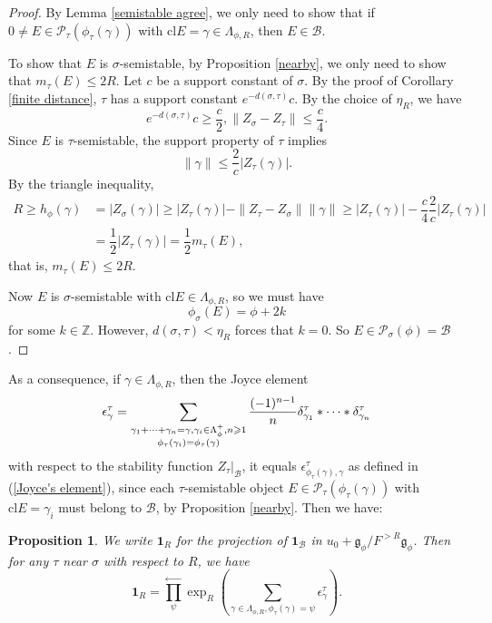 \documentclass[a4paper,12pt]{amsart}
\numberwithin{equation}{section}
\newtheorem{proposition}[theorem]{Proposition}
\newcommand{\cl}{\mathrm{cl}}
\newcommand{\1}{\mathbf{1}}
\begin{document}
\begin{proof}
    By Lemma \ref{semistable agree}, we only need to show that if $0\neq E\in\mathcal{P}_\tau(\phi_\tau(\gamma))$ with $\cl E=\gamma\in\Lambda_{\phi,R}$, then $E\in\mathcal{B}$.

    To show that $E$ is $\sigma$-semistable, by Proposition \ref{nearby}, we only need to show that $m_\tau(E)\leqslant2R$. Let $c$ be a support constant of $\sigma$. By the proof of Corollary \ref{finite distance}, $\tau$ has a support constant $e^{-d(\sigma,\tau)}c$. By the choice of $\eta_R$, we have
    \[e^{-d(\sigma,\tau)}c\geqslant\dfrac{c}{2},\|Z_\sigma-Z_\tau\|\leqslant\dfrac{c}{4}.\]
    Since $E$ is $\tau$-semistable, the support property of $\tau$ implies
    \[\|\gamma\|\leqslant\dfrac{2}{c}|Z_\tau(\gamma)|.\]
    By the triangle inequality,
    \begin{align*}
        R\geqslant h_\phi(\gamma)&=|Z_\sigma(\gamma)|\geqslant|Z_\tau(\gamma)|-\|Z_\tau-Z_\sigma\|\|\gamma\|\geqslant|Z_\tau(\gamma)|-\dfrac{c}{4}\dfrac{2}{c}|Z_\tau(\gamma)|\\
        &=\dfrac12|Z_\tau(\gamma)|=\dfrac12m_\tau(E),
    \end{align*}
    that is, $m_\tau(E)\leqslant2R$.

    Now $E$ is $\sigma$-semistable with $\cl E\in\Lambda_{\phi,R}$, so we must have
    \[\phi_\sigma(E)=\phi+2k\]
    for some $k\in\mathbb{Z}$. However, $d(\sigma,\tau)<\eta_R$ forces that $k=0$. So $E\in\mathcal{P}_\sigma(\phi)=\mathcal{B}$.
\end{proof}
As a consequence, if $\gamma\in\Lambda_{\phi,R}$, then the Joyce element
\[\epsilon^\tau_\gamma=\sum_{\begin{subarray}{c}
    \gamma_1+\dots+\gamma_n=\gamma,\gamma_i\in\Lambda_\phi^+,n\geqslant1\\
    \phi_\tau(\gamma_i)=\phi_\tau(\gamma)
\end{subarray}}\dfrac{(-1)^{n-1}}{n}\delta^\tau_{\gamma_1}*\dots*\delta^\tau_{\gamma_n}\]
with respect to the stability function $Z_\tau|_{\mathcal{B}}$, it equals $\epsilon^\tau_{\phi_\tau(\gamma),\gamma}$ as defined in (\ref{Joyce's element}), since each $\tau$-semistable object $E\in\mathcal{P}_\tau(\phi_\tau(\gamma))$ with $\cl E=\gamma_i$ must belong to $\mathcal{B}$, by Proposition \ref{nearby}. Then we have:
\begin{proposition}\label{decomposition of 1}
    We write $\1_R$ for the projection of $\1_{\mathcal{B}}$ in $u_0+\mathfrak{g}_\phi/F^{>R}\mathfrak{g}_\phi$. Then for any $\tau$ near $\sigma$ with respect to $R$, we have
    \[\1_R=\prod_\psi^\leftarrow\exp_R\left(\sum_{\gamma\in\Lambda_{\phi,R},\phi_\tau(\gamma)=\psi}\epsilon^\tau_\gamma\right).\]
\end{proposition}
\end{document}
